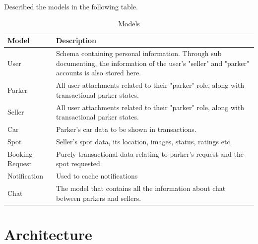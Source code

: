                     \pagebreak
                    \clearpage
                    
                    
                    Described the models in the following table.
                    \begin{table}[htb]
                        \centering
                        \begin{tabular}{ | l | p{125mm} |}
                            \hline
                            Model & Description \\
                            \hline
                            \hline
                            User & Schema containing personal information. Through sub documenting, the information of the user's "seller" and "parker" accounts is also stored here.\\
                            \hline
                            Parker & All user attachments related to their "parker" role, along with transactional parker states. \\
                            \hline
                            Seller & All user attachments related to their "parker" role, along with transactional parker states. \\
                            \hline
                            Car & Parker's car data to be shown in transactions. \\
                            \hline
                            Spot & Seller's spot data, its location, images, status, ratings etc. \\
                            \hline
                            Booking Request & Purely transactional data relating to parker's request and the spot requested. \\
                            \hline
                            Notification & Used to cache notifications  \\
                            \hline
                            Chat & The model that contains all the information about chat between parkers and sellers. \\
                            \hline
                        \end{tabular}
                        \caption{Models}
                        \label{tab:models}
                    \end{table}



                
        \pagebreak
        \section{Architecture}

